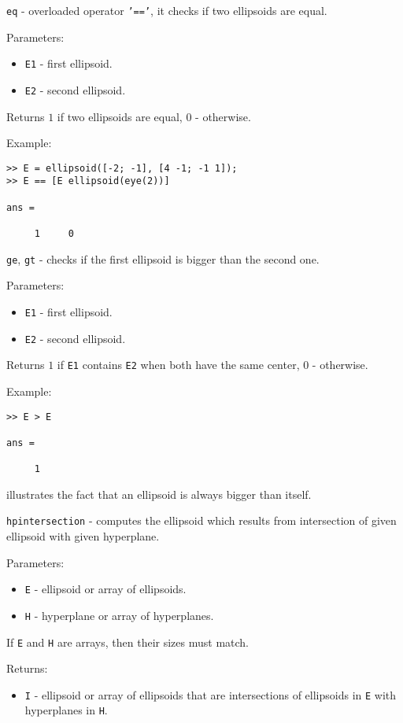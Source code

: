 \newpage

{\Large {\tt eq}} - overloaded operator {\tt '=='},
it checks if two ellipsoids are equal.

Parameters:
\begin{itemize}
\item {\tt E1} - first ellipsoid.
\item {\tt E2} - second ellipsoid.
\end{itemize}

Returns $1$ if two ellipsoids are equal, $0$ - otherwise.

Example:
{\tt \begin{verbatim}
>> E = ellipsoid([-2; -1], [4 -1; -1 1]);
>> E == [E ellipsoid(eye(2))]

ans =

     1     0
\end{verbatim} }

\newpage

{\Large {\tt ge}}, {\Large {\tt gt}} - checks if the first ellipsoid is bigger
than the second one.

Parameters:
\begin{itemize}
\item {\tt E1} - first ellipsoid.
\item {\tt E2} - second ellipsoid.
\end{itemize}

Returns $1$ if {\tt E1} contains {\tt E2} when both have the same center,
$0$ - otherwise.

Example:
{\tt \begin{verbatim}
>> E > E

ans =

     1
\end{verbatim} }
illustrates the fact that an ellipsoid is always bigger than itself.

\newpage

{\Large {\tt hpintersection}} - computes the ellipsoid which results from
intersection of given ellipsoid with given hyperplane.

Parameters:
\begin{itemize}
\item {\tt E} - ellipsoid or array of ellipsoids.
\item {\tt H} - hyperplane or array of hyperplanes.
\end{itemize}
If {\tt E} and {\tt H} are arrays, then their sizes must match.

Returns:
\begin{itemize}
\item {\tt I} - ellipsoid or array of ellipsoids that are intersections of
ellipsoids in {\tt E} with hyperplanes in {\tt H}.
\end{itemize}

